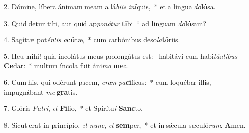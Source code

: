 2. Dómine, líbera ánimam meam a lá\textit{bi}\textit{is} \textit{in}\textbf{í}quis,~*  et a lingua \textit{do}\textbf{ló}sa.\

3. Quid detur tibi, aut quid ap\textit{po}\textit{ná}\textit{tur} \textbf{ti}bi~*  ad linguam \textit{do}\textbf{ló}sam?\

4. Sagíttæ pot\textit{én}\textit{tis} \textit{a}\textbf{cú}tæ,~*  cum carbónibus deso\textit{la}\textbf{tó}riis.\

5. Heu mihi! quia incolátus meus prolongátus est: \dag\  habitávi cum habi\textit{tán}\textit{ti}\textit{bus} \textbf{Ce}dar:~*  multum íncola fuit áni\textit{ma} \textbf{me}a.\

6. Cum his, qui odérunt pacem, \textit{e}\textit{ram} \textit{pa}\textbf{cí}ficus:~*  cum loquébar illis, impugnábant \textit{me} \textbf{gra}tis.\

7. Glória \textit{Pa}\textit{tri}, \textit{et} \textbf{Fí}lio,~*  et Spirítu\textit{i} \textbf{Sanc}to.\

8. Sicut erat in princípio, \textit{et} \textit{nunc}, \textit{et} \textbf{sem}per,~*  et in sǽcula sæculó\textit{rum}. \textbf{A}men.\

